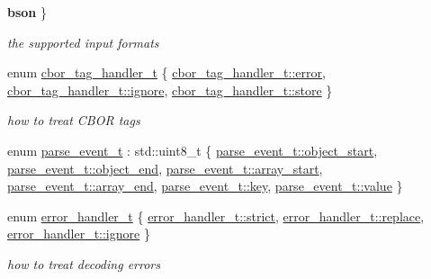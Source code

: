 \begin{DoxyCompactItemize}
{\bfseries bson}
 \}\begin{DoxyCompactList}\small\item\em the supported input formats \end{DoxyCompactList}
\item 
enum \hyperlink{namespacenlohmann_1_1detail_a58bb1ef1a9ad287a9cfaf1855784d9ac}{cbor\+\_\+tag\+\_\+handler\+\_\+t} \{ \hyperlink{namespacenlohmann_1_1detail_a58bb1ef1a9ad287a9cfaf1855784d9acacb5e100e5a9a3e7f6d1fd97512215282}{cbor\+\_\+tag\+\_\+handler\+\_\+t\+::error}, 
\hyperlink{namespacenlohmann_1_1detail_a58bb1ef1a9ad287a9cfaf1855784d9aca567bc1d268f135496de3d5b946b691f3}{cbor\+\_\+tag\+\_\+handler\+\_\+t\+::ignore}, 
\hyperlink{namespacenlohmann_1_1detail_a58bb1ef1a9ad287a9cfaf1855784d9aca8cd892b7b97ef9489ae4479d3f4ef0fc}{cbor\+\_\+tag\+\_\+handler\+\_\+t\+::store}
 \}\begin{DoxyCompactList}\small\item\em how to treat C\+B\+OR tags \end{DoxyCompactList}
\item 
enum \hyperlink{namespacenlohmann_1_1detail_a59e696b1dad6d0d99c172ac4518c2042}{parse\+\_\+event\+\_\+t} \+: std\+::uint8\+\_\+t \{ \newline
\hyperlink{namespacenlohmann_1_1detail_a59e696b1dad6d0d99c172ac4518c2042ae73f17027cb0acbb537f29d0a6944b26}{parse\+\_\+event\+\_\+t\+::object\+\_\+start}, 
\hyperlink{namespacenlohmann_1_1detail_a59e696b1dad6d0d99c172ac4518c2042af63e2a2468a37aa4f394fcc3bcb8249c}{parse\+\_\+event\+\_\+t\+::object\+\_\+end}, 
\hyperlink{namespacenlohmann_1_1detail_a59e696b1dad6d0d99c172ac4518c2042aa4388a3d92419edbb1c6efd4d52461f3}{parse\+\_\+event\+\_\+t\+::array\+\_\+start}, 
\hyperlink{namespacenlohmann_1_1detail_a59e696b1dad6d0d99c172ac4518c2042a49642fb732aa2e112188fba1f9d3ef7f}{parse\+\_\+event\+\_\+t\+::array\+\_\+end}, 
\newline
\hyperlink{namespacenlohmann_1_1detail_a59e696b1dad6d0d99c172ac4518c2042a3c6e0b8a9c15224a8228b9a98ca1531d}{parse\+\_\+event\+\_\+t\+::key}, 
\hyperlink{namespacenlohmann_1_1detail_a59e696b1dad6d0d99c172ac4518c2042a2063c1608d6e0baf80249c42e2be5804}{parse\+\_\+event\+\_\+t\+::value}
 \}
\item 
enum \hyperlink{namespacenlohmann_1_1detail_a5a76b60b26dc8c47256a996d18d967df}{error\+\_\+handler\+\_\+t} \{ \hyperlink{namespacenlohmann_1_1detail_a5a76b60b26dc8c47256a996d18d967dfa2133fd717402a7966ee88d06f9e0b792}{error\+\_\+handler\+\_\+t\+::strict}, 
\hyperlink{namespacenlohmann_1_1detail_a5a76b60b26dc8c47256a996d18d967dfa9dde360102c103867bd2f45872f1129c}{error\+\_\+handler\+\_\+t\+::replace}, 
\hyperlink{namespacenlohmann_1_1detail_a5a76b60b26dc8c47256a996d18d967dfa567bc1d268f135496de3d5b946b691f3}{error\+\_\+handler\+\_\+t\+::ignore}
 \}\begin{DoxyCompactList}\small\item\em how to treat decoding errors \end{DoxyCompactList}
\end{DoxyCompactItemize}
